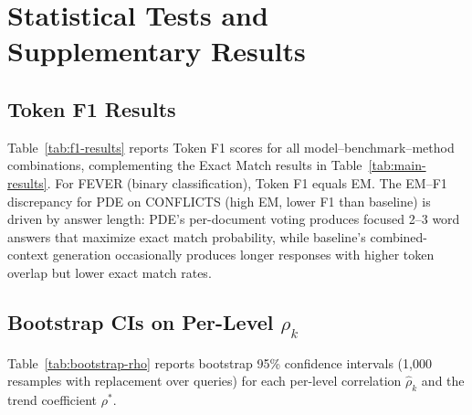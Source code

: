 \documentclass[11pt]{article}
\theoremstyle{definition}
\begin{document}
\section{Statistical Tests and Supplementary Results}
\label{sec:appendix-stats}

\subsection{Token F1 Results}
\label{sec:appendix-f1}
\label{tab:f1-results}

Table~\ref{tab:f1-results} reports Token F1 scores for all
model--benchmark--method combinations, complementing the Exact Match
results in Table~\ref{tab:main-results}.
For FEVER (binary classification), Token F1 equals EM.
The EM--F1 discrepancy for PDE on CONFLICTS (high EM, lower F1
than baseline) is driven by answer length: PDE's per-document
voting produces focused 2--3 word answers that maximize exact
match probability, while baseline's combined-context generation
occasionally produces longer responses with higher token overlap
but lower exact match rates.


\subsection{Bootstrap CIs on Per-Level \texorpdfstring{$\hat{\rho}_k$}{rho-hat-k}}

Table~\ref{tab:bootstrap-rho} reports bootstrap 95\% confidence intervals
(1,000 resamples with replacement over queries) for each per-level
correlation \(\hat{\rho}_k\) and the trend coefficient \(\rho^*\).
\end{document}
